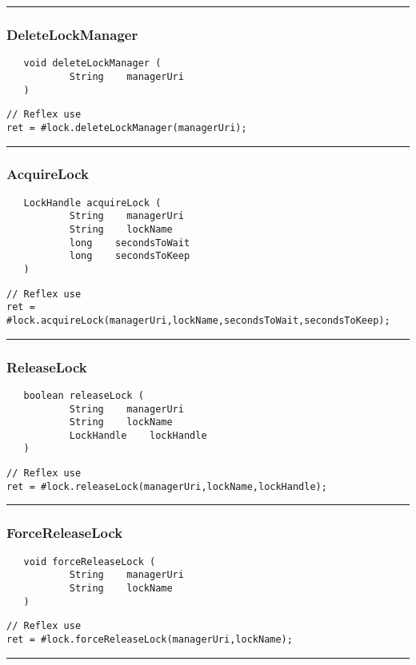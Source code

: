 \rule{15cm}{2pt}
\subsubsection{DeleteLockManager}
\label{Api:DeleteLockManager}
\begin{verbatim}
   void deleteLockManager (
           String    managerUri
   )
\end{verbatim}
\begin{lstlisting}[language=reflex]
// Reflex use
ret = #lock.deleteLockManager(managerUri);
\end{lstlisting}



\rule{15cm}{2pt}
\subsubsection{AcquireLock}
\label{Api:AcquireLock}
\begin{verbatim}
   LockHandle acquireLock (
           String    managerUri
           String    lockName
           long    secondsToWait
           long    secondsToKeep
   )
\end{verbatim}
\begin{lstlisting}[language=reflex]
// Reflex use
ret = #lock.acquireLock(managerUri,lockName,secondsToWait,secondsToKeep);
\end{lstlisting}



\rule{15cm}{2pt}
\subsubsection{ReleaseLock}
\label{Api:ReleaseLock}
\begin{verbatim}
   boolean releaseLock (
           String    managerUri
           String    lockName
           LockHandle    lockHandle
   )
\end{verbatim}
\begin{lstlisting}[language=reflex]
// Reflex use
ret = #lock.releaseLock(managerUri,lockName,lockHandle);
\end{lstlisting}



\rule{15cm}{2pt}
\subsubsection{ForceReleaseLock}
\label{Api:ForceReleaseLock}
\begin{verbatim}
   void forceReleaseLock (
           String    managerUri
           String    lockName
   )
\end{verbatim}
\begin{lstlisting}[language=reflex]
// Reflex use
ret = #lock.forceReleaseLock(managerUri,lockName);
\end{lstlisting}



\rule{15cm}{2pt}
